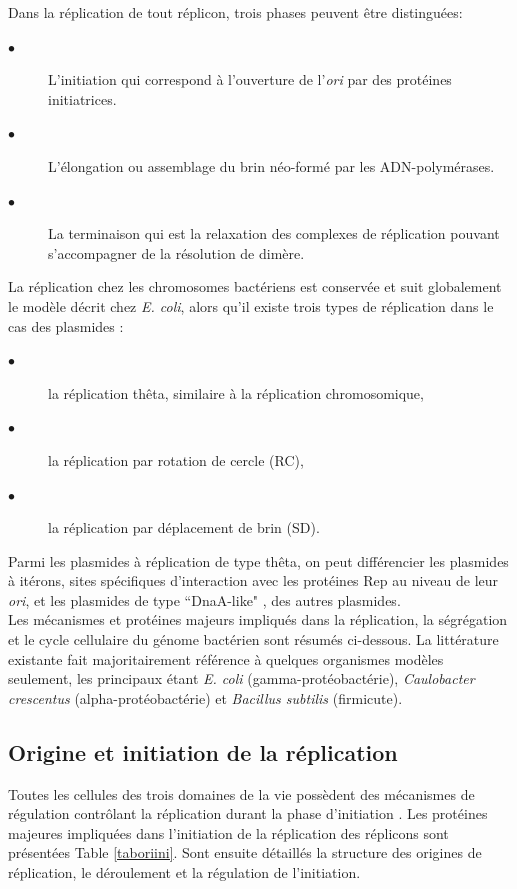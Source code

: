 Dans la réplication de tout réplicon, trois phases peuvent être distinguées: 
\begin{description}
\item[$\bullet$] L'initiation qui correspond à l'ouverture de l'\textit{ori} par des protéines initiatrices.
\item[$\bullet$] L'élongation ou assemblage du brin néo-formé par les ADN-polymérases.
\item[$\bullet$] La terminaison qui est la relaxation des complexes de réplication pouvant s'accompagner de la résolution de dimère.
\end{description}
La réplication chez les chromosomes bactériens est conservée et suit globalement le modèle décrit chez \textit{E. coli}, alors qu'il existe trois types de réplication dans le cas des plasmides \citep{DelSolar1998}:
\begin{description}
\item[$\bullet$] la réplication thêta, similaire à la réplication chromosomique,
\item[$\bullet$] la réplication par rotation de cercle (RC),
\item[$\bullet$] la réplication par déplacement de brin (SD).
\end{description}
Parmi les plasmides à réplication de type thêta, on peut différencier les plasmides à itérons, sites spécifiques d'interaction avec les protéines Rep au niveau de leur \textit{ori}, et les plasmides de type ``DnaA-like" \citep{petersen2011origin}, des autres plasmides. \\
Les mécanismes et protéines majeurs impliqués dans la réplication, la ségrégation et le cycle cellulaire du génome bactérien sont résumés ci-dessous. La littérature existante fait majoritairement référence à quelques organismes modèles seulement, les principaux étant \textit{E. coli} (gamma-protéobactérie), \textit{Caulobacter crescentus} (alpha-protéobactérie) et \textit{Bacillus subtilis} (firmicute).\\


 \subsection{Origine et initiation de la réplication}\label{ori}
	Toutes les cellules des trois domaines de la vie possèdent des mécanismes de régulation contrôlant la réplication durant la phase d'initiation \citep{clark1967dna}. Les protéines majeures impliquées dans l'initiation de la réplication des réplicons sont présentées Table \ref{taboriini}. Sont ensuite détaillés la structure des origines de réplication, le déroulement et la régulation de l'initiation.
  
